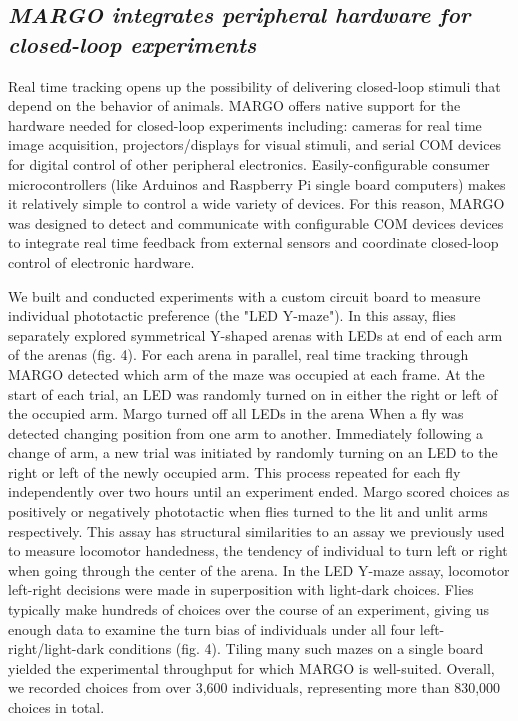 \documentclass[10pt]{article}
\begin{document}
\begin{multicols}{2}
\subsection*{\textit{MARGO integrates peripheral hardware for closed-loop experiments}}

Real time tracking opens up the possibility of delivering closed-loop stimuli that depend on the behavior of animals. MARGO offers native support for the hardware needed for closed-loop experiments including: cameras for real time image acquisition, projectors/displays for visual stimuli, and serial COM devices for digital control of other peripheral electronics. Easily-configurable consumer microcontrollers (like Arduinos and Raspberry Pi single board computers) makes it relatively simple to control a wide variety of devices. For this reason, MARGO was designed to detect and communicate with configurable COM devices devices to integrate real time feedback from external sensors and coordinate closed-loop control of electronic hardware. 

We built and conducted experiments with a custom circuit board to measure individual phototactic preference (the "LED Y-maze"). In this assay, flies separately explored symmetrical Y-shaped arenas with LEDs at end of each arm of the arenas (fig. 4). For each arena in parallel, real time tracking through MARGO detected which arm of the maze was occupied at each frame. At the start of each trial, an LED was randomly turned on in either the right or left  of the occupied arm. Margo turned off all LEDs in the arena When a fly was detected changing position from one arm to another. Immediately following a change of arm, a new trial was initiated by randomly turning on an LED to the right or left of the newly occupied arm. This process repeated for each fly independently over two hours until an experiment ended. Margo scored choices as positively or negatively phototactic when flies turned to the lit and unlit arms respectively. This assay has structural similarities to an assay we previously used to measure locomotor handedness, the tendency of individual to turn left or right when going through the center of the arena. In the LED Y-maze assay, locomotor left-right decisions were made in superposition with light-dark choices. Flies typically make hundreds of choices over the course of an experiment, giving us enough data to examine the turn bias of individuals under all four left-right/light-dark conditions (fig. 4). Tiling many such mazes on a single board yielded the experimental throughput for which MARGO is well-suited. Overall, we recorded choices from over 3,600 individuals, representing more than 830,000 choices in total.


\end{multicols}
\end{document}
